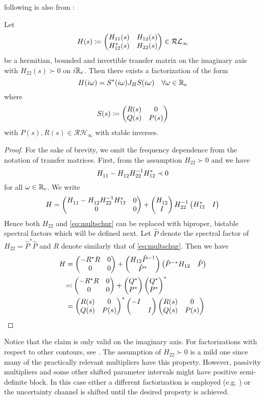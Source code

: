 following is also from \cite{goh96}:
\begin{thm} Let 
\[
H(s) \coloneqq \begin{pmatrix}H_{11}(s)&H_{12}(s)\\ H^*_{12}(s)&H_{22}(s)\end{pmatrix} \in\mathcal{RL}_\infty
\]
be a hermitian, bounded and invertible transfer matrix on the imaginary axis with $H_{22}(s)\succ 0$ on $i\mathbb{R}_e$. 
Then there exists a factorization of the form
\[
H(i\omega) = S^*(i\omega)J_HS(i\omega) \quad \forall\omega\in\mathbb{R}_e
\]
where
\[
S(s) \coloneqq \begin{pmatrix}R(s)&0\\ Q(s)&P(s)\end{pmatrix}
\]
with $P(s),R(s)\in\mathcal{RH}_\infty$ with stable inverses.
\end{thm}

\begin{proof} For the sake of brevity, we omit the frequency dependence from the notation of transfer matrices. First, 
from the assumption $H_{22}\succ 0$ and  we have 
\begin{equation}
H^{\vphantom{-1}}_{11} -H^{\vphantom{-1}}_{12}H_{22}^{-1}H_{12}^* \prec 0
\label{eq:multschur}
\end{equation}
for all $\omega\in\mathbb{R}_e$. We write
\[
H = \begin{pmatrix}H^{\vphantom{-1}}_{11} -H^{\vphantom{-1}}_{12}H_{22}^{-1}H_{12}^*&0\\ 0&0\end{pmatrix} + 
\begin{pmatrix}H^{\vphantom{-1}}_{12}\\ I\end{pmatrix}H_{22}^{-1}\begin{pmatrix}H_{12}^* &I\end{pmatrix}
\]
Hence both $H_{22}$ and \eqref{eq:multschur} can be replaced with biproper, bistable spectral factors 
which will be defined next. Let $\hat{P}$ denote the spectral factor of $H_{22} = \hat{P}^*\hat{P}$ and $R$ denote similarly
that of \eqref{eq:multschur}. Then we have
\begin{align*}
H &= \pmatr{-R^*R&0\\0&0} + \pmatr{H_{12}\inv{\hat{P}}\\\hat{P}^*}\pmatr{{\hat{P}}^{-*}H_{12}&\hat{P}} \\
&\reflectbox{$\coloneqq$} 
\pmatr{-R^*R&0\\0&0}+\pmatr{Q^*\\P^*}\pmatr{Q^*\\P^*}^*\\
&= \pmatr{R(s)&0\\ Q(s)&P(s)}^* \pmatr{-I&\\ &I}\pmatr{R(s)&0\\ Q(s)&P(s)}
\end{align*}

\end{proof}

Notice that the claim is only valid on the imaginary axis. For factorizations with respect to other contours, see \cite{bart10}. 
The assumption of $H_{22}\succ 0$ is a mild one since many of the practically relevant multipliers have this property. However, 
passivity multipliers and some other shifted parameter intervals might have positive semi-definite block. In 
this case either a different factorization is employed (e.g. \cite{goh962}) or the uncertainty channel is shifted until the desired 
property is achieved.  




